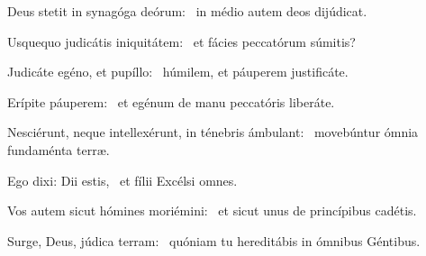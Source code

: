\item Deus stetit in synagóga deórum:~\psstar{} in médio autem deos dijúdicat.

\item Usquequo judicátis iniquitátem:~\psstar{} et fácies peccatórum súmitis?

\item Judicáte egéno, et pupíllo:~\psstar{} húmilem, et páuperem justificáte.

\item Erípite páuperem:~\psstar{} et egénum de manu peccatóris liberáte.

\item Nesciérunt, neque intellexérunt, in ténebris ámbulant:~\psstar{} movebúntur ómnia fundaménta terræ.

\item Ego dixi: Dii estis,~\psstar{} et fílii Excélsi omnes.

\item Vos autem sicut hómines moriémini:~\psstar{} et sicut unus de princípibus cadétis.

\item Surge, Deus, júdica terram:~\psstar{} quóniam tu hereditábis in ómnibus Géntibus.